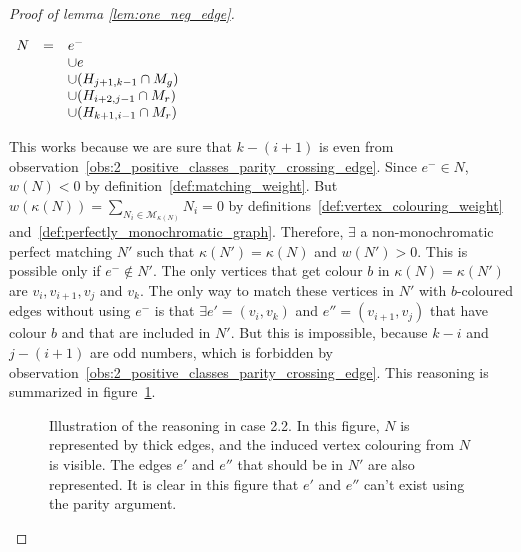 \begin{proof}[Proof of lemma \ref{lem:one_neg_edge}]
\begin{enumerate}
\begin{enumerate}
                \begin{center}
                    $\begin{array}{r c l}
                        N & = & e^-                                 \\
                          &   & \cup e                              \\
                          &   & \cup (H_{j+1, k-1} \cap M_g)        \\
                          &   & \cup (H_{i + 2, j - 1} \cap M_r)    \\
                          &   & \cup (H_{k+1, i-1} \cap M_r)
                    \end{array}$
                \end{center}

                This works because we are sure that $k - (i + 1)$ is even from observation~\ref{obs:2_positive_classes_parity_crossing_edge}.
                Since $e^- \in N$, $w(N) < 0$ by definition~\ref{def:matching_weight}.
                But $w(\kappa(N)) = \sum\limits_{N_i \in \mathcal{M}_{\kappa(N)}} N_i = 0$ by definitions~\ref{def:vertex_colouring_weight} and~\ref{def:perfectly_monochromatic_graph}.
                Therefore, $\exists$ a non-monochromatic perfect matching $N'$ such that $\kappa(N') = \kappa(N)$ and $w(N') > 0$.
                This is possible only if $e^- \notin N'$.
                The only vertices that get colour $b$ in $\kappa(N) = \kappa(N')$ are $v_i, v_{i+1}, v_j$ and $v_k$.
                The only way to match these vertices in $N'$ with $b$-coloured edges without using $e^-$ is that $\exists e' = (v_i, v_k)$ and $e'' = (v_{i+1}, v_j)$ that have colour $b$ and that are included in $N'$.
                But this is impossible, because $k-i$ and $j-(i+1)$ are odd numbers, which is forbidden by observation~\ref{obs:2_positive_classes_parity_crossing_edge}.
                This reasoning is summarized in figure~\ref{fig:unique_neg_2_2}.

                \begin{figure}[H]
                    \caption{Illustration of the reasoning in case 2.2. In this figure, $N$ is represented by thick edges, and the induced vertex colouring from $N$ is visible. The edges $e'$ and $e''$ that should be in $N'$ are also represented. It is clear in this figure that $e'$ and $e''$ can't exist using the parity argument.}
                    \label{fig:unique_neg_2_2}
                \end{figure}


\end{enumerate}
\end{enumerate}
\end{proof}
